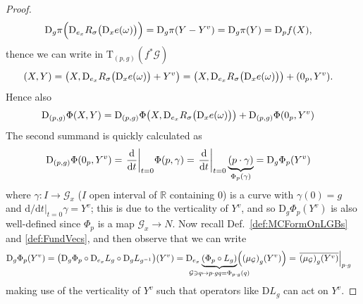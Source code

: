 \documentclass[reqno,a4paper,oneside]{amsart}
\theoremstyle{plain}
\theoremstyle{remark}
\theoremstyle{definition}
\begin{document}
\begin{proof}
\begin{align*}
\mathrm{D}_g\pi \Bigl( \mathrm{D}_{e_x}R_\sigma \bigl( \mathrm{D}_x e (\omega) \bigr) \Bigr)
&=
\mathrm{D}_g \pi (Y - Y^v)
=
\mathrm{D}_g \pi (Y)
=
\mathrm{D}_p f (X),
\end{align*}
thence we can write in $\mathrm{T}_{(p, g)}(f^*\mathcal{G})$
\begin{align*}
(X, Y)
&=
\mleft(X, \mathrm{D}_{e_x}R_\sigma \bigl( \mathrm{D}_x e (\omega) \bigr) + Y^v \mright)
=
\mleft(X, \mathrm{D}_{e_x}R_\sigma \bigl( \mathrm{D}_x e (\omega) \bigr) \mright)
	+ (0_p, Y^v).
\end{align*}
Hence also
\begin{align}\label{DifferentialOfActionSplitFirst}
\mathrm{D}_{(p, g)}\Phi(X, Y)
&=
\mathrm{D}_{(p, g)}\Phi\mleft(X, \mathrm{D}_{e_x}R_\sigma \bigl( \mathrm{D}_x e (\omega) \bigr) \mright)
	+ \mathrm{D}_{(p, g)}\Phi(0_p, Y^v)
\end{align}
The second summand is quickly calculated as
\begin{align*}
\mathrm{D}_{(p, g)}\Phi(0_p, Y^v)
&=
\mleft.\frac{\mathrm{d}}{\mathrm{d}t}\mright|_{t=0} \Phi(p, \gamma)
=
\mleft.\frac{\mathrm{d}}{\mathrm{d}t}\mright|_{t=0} \underbrace{(p \cdot \gamma)}
	_{\Phi_p(\gamma)}
=
\mathrm{D}_{g}\Phi_p (Y^v)
\end{align*}
where $\gamma: I \to \mathcal{G}_x$ ($I$ open interval of $\mathbb{R}$ containing 0) is a curve with $\gamma(0) = g$ and $\mathrm{d}/\mathrm{d}t|_{t=0} \gamma = Y^v$; this is due to the verticality of $Y^v$, and so $\mathrm{D}_g\Phi_p(Y^v)$ is also well-defined since $\Phi_p$ is a map $\mathcal{G}_x \to N$. Now recall Def.\ \ref{def:MCFormOnLGBs} and \ref{def:FundVecs}, and then observe that we can write
\begin{align}\label{ClassicalWayToWriteLeibnizRuleWithLeftPushForwardInsteadOfMCForm}
\mathrm{D}_{g}\Phi_p (Y^v)
&=
\mleft(\mathrm{D}_{g}\Phi_p \circ \mathrm{D}_{e_x}L_g \circ \mathrm{D}_g L_{g^{-1}} \mright)(Y^v)
=
\mathrm{D}_{e_x}\underbrace{\mleft( \Phi_p \circ L_g \mright)}
	_{\mathclap{ \mathcal{G} \ni q \mapsto p \cdot gq = \Phi_{p \cdot g}(q) }}
	\mleft(\mleft( \mu_{\mathcal{G}}\mright)_g (Y^v) \mright)
=
\mleft.{\overline{\mleft( \mu_{\mathcal{G}}\mright)_g (Y^v)}}\mright|_{p \cdot g}
\end{align}
making use of the verticality of $Y^v$ such that operators like $\mathrm{D}L_g$ can act on $Y^v$.


\end{proof}
\end{document}
